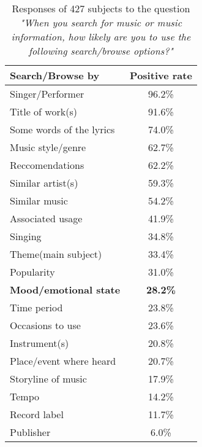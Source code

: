 \begin{table}[h!]
	\centering
	\begin{tabular}{|l | c|}
		\hline
		Search/Browse by & Positive rate\\ [0.5ex] 
		\hline\hline Singer/Performer 			&		96.2\%	\\ 
		\hline	Title of work(s) 					& 		91.6\%	\\ 
		\hline	Some words of the lyrics 	& 		74.0\% 	\\
		\hline	Music style/genre 				&		62.7\%	\\
		\hline	Reccomendations 				&		62.2\%	\\
		\hline	Similar artist(s)					&		59.3\%	\\
		\hline	Similar music 					&		54.2\%	\\
		\hline	Associated usage				&		41.9\% 	\\
		\hline	Singing								&		34.8\% 	\\
		\hline	Theme(main subject)			&		33.4\% 	\\
		\hline	Popularity							&		31.0\% 	\\
		\hline	\textbf{Mood/emotional state	}	&		\textbf{28.2\%} 	\\
		\hline	Time period						&		23.8\% 	\\
		\hline	Occasions to use				&		23.6\% 	\\
		\hline	Instrument(s)					&		20.8\% 	\\
		\hline	Place/event where heard	&		20.7\% 	\\
		\hline	Storyline of music				&		17.9\% 	\\
		\hline	Tempo								&		14.2\% 	\\
		\hline	Record label						&		11.7\% 	\\
		\hline	Publisher							&		6.0\% 	\\
		\hline
	\end{tabular}
	\caption{Responses of 427 subjects to the question \textit{"When you search for music or music information, how likely are you to use the following search/browse options?"}}
	\label{table:browse_music}
\end{table}

